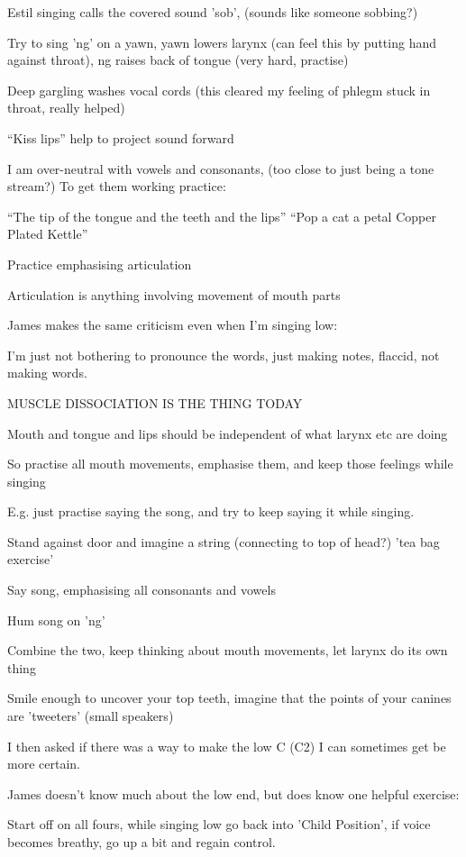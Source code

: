 \documentclass[14pt,a4paper]{memoir}
\begin{document}
\begin{itemize}
  Estil singing calls the covered sound 'sob', (sounds like someone sobbing?)

  Try to sing 'ng' on a yawn, yawn lowers larynx (can feel this by putting hand against throat), ng raises back of tongue (very hard, practise)


  Deep gargling washes vocal cords (this cleared my feeling of phlegm stuck in throat, really helped)

  ``Kiss lips'' help to project sound forward

  I am over-neutral with vowels and consonants, (too close to just being a tone stream?)
  To get them working practice:

  ``The tip of the tongue and the teeth and the lips''
  ``Pop a cat a petal Copper Plated Kettle''

  Practice emphasising articulation

  Articulation is anything involving movement of mouth parts

  James makes the same criticism even when I'm singing low:

  I'm just not bothering to pronounce the words, just making notes, flaccid, not making words.

  MUSCLE DISSOCIATION IS THE THING TODAY

  Mouth and tongue and lips should be independent of what larynx etc are doing

  So practise all mouth movements, emphasise them, and keep those feelings while singing

  E.g. just practise saying the song, and try to keep saying it while singing.

  Stand against door and imagine a string (connecting to top of head?) 'tea bag exercise'

  Say song, emphasising all consonants and vowels

  Hum song on 'ng'

  Combine the two, keep thinking about mouth movements, let larynx do its own thing

  Smile enough to uncover your top teeth, imagine that the points of your canines are 'tweeters' (small speakers)


  I then asked if there was a way to make the low C (C2) I can sometimes get be more certain.

  James doesn't know much about the low end, but does know one helpful exercise:

  Start off on all fours, while singing low go back into 'Child Position', if voice becomes breathy, go up a bit and regain control.
  

\end{itemize}
\end{document}
